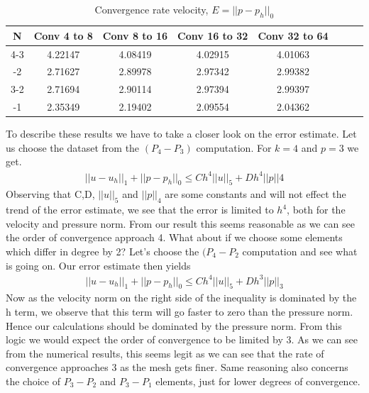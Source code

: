 \documentclass[a4paper,norsk]{article}
\begin{document}
\begin{table}[ht]
\caption {Convergence rate velocity, $E = ||p-p_h||_0$} 
\centering
\begin{tabular}{c|ccccccc}
\hline
\rowcolor{LightCyan}
N  & Conv 4 to 8  &  Conv 8 to 16  &  Conv 16 to 32 &  Conv 32 to 64\\
\hline
4-3   &     4.22147   &      4.08419   &       4.02915 & 4.01063  \\ \hline
\rowcolor{LightCyan} \hline
4-2   &     2.71627   &      2.89978   &       2.97342 & 2.99382  \\ \hline 
3-2   &     2.71694   &      2.90114   &       2.97394 & 2.99397   \\ \hline 
\rowcolor{LightCyan} \hline
3-1   &     2.35349   &      2.19402   &       2.09554 & 2.04362   \\ 
\hline
\end{tabular}
\end{table}
To describe these results we have to take a closer look on the error estimate. Let us choose the dataset from the $(P_4 - P_3)$
computation. For $k=4$ and $p=3$ we get.  
\begin{align*}
 ||u - u_h||_1 + ||p - p_h||_0 \leq Ch^4||u||_{5} + Dh^{4} ||p||{4}
\end{align*}
Observing that C,D, $||u||_{5}$ and $||p||_{4}$ are some constants and will not effect the trend of the error estimate, we see that
the error is limited to $h^4$, both for the velocity and pressure norm. From our result this seems reasonable as we can see the order of convergence
approach 4.
What  about if we choose some elements which differ in degree by 2? Let's choose the $(P_4 - P_2$ computation and see what is going on. Our error estimate then yields
\begin{align*}
 ||u - u_h||_1 + ||p - p_h||_0 \leq Ch^4||u||_{5} + Dh^{3} ||p||_{3}
\end{align*}
Now as the velocity norm on the right side of the inequality is dominated by the h term, we observe that this term will go faster to zero than the pressure norm. Hence our 
calculations should be dominated by the pressure norm. From this logic we would expect the order of convergence to be limited by 3. As we can see from the numerical results, this seems legit as we can see that the rate of convergence 
approaches 3 as the mesh gets finer.  Same reasoning also concerns the choice of
$P_3-P_2$ and $P_3 - P_1$ elements, just for lower degrees of convergence.
\end{document}
